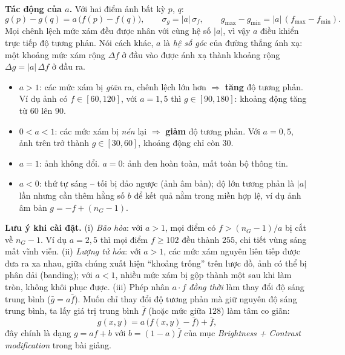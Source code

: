 \textbf{Tác động của $a$.} Với hai điểm ảnh bất kỳ $p$, $q$:
\begin{equation}
g(p) - g(q) = a\,\big(f(p) - f(q)\big), \qquad \sigma_g = |a|\,\sigma_f, \qquad g_{\max} - g_{\min} = |a|\,(f_{\max} - f_{\min}).
\label{eq:w5_contrast_scale}
\end{equation}
Mọi chênh lệch mức xám đều được nhân với cùng hệ số $|a|$, vì vậy $a$ điều khiển trực tiếp độ tương phản. Nói cách khác, $a$ là \emph{hệ số góc} của đường thẳng ánh xạ: một khoảng mức xám rộng $\Delta f$ ở đầu vào được ánh xạ thành khoảng rộng $\Delta g = |a|\,\Delta f$ ở đầu ra.
\begin{itemize}
    \item $a > 1$: các mức xám bị \emph{giãn} ra, chênh lệch lớn hơn $\Rightarrow$ \textbf{tăng} độ tương phản. Ví dụ ảnh có $f \in [60, 120]$, với $a = 1{,}5$ thì $g \in [90, 180]$: khoảng động tăng từ $60$ lên $90$.
    \item $0 < a < 1$: các mức xám bị \emph{nén} lại $\Rightarrow$ \textbf{giảm} độ tương phản. Với $a = 0{,}5$, ảnh trên trở thành $g \in [30, 60]$, khoảng động chỉ còn $30$.
    \item $a = 1$: ảnh không đổi. $a = 0$: ảnh đen hoàn toàn, mất toàn bộ thông tin.
    \item $a < 0$: thứ tự sáng -- tối bị đảo ngược (ảnh âm bản); độ lớn tương phản là $|a|$ lần nhưng cần thêm hằng số $b$ để kết quả nằm trong miền hợp lệ, ví dụ ảnh âm bản $g = -f + (n_G - 1)$.
\end{itemize}

\textbf{Lưu ý khi cài đặt.} (i) \emph{Bão hòa}: với $a > 1$, mọi điểm có $f > (n_G - 1)/a$ bị cắt về $n_G - 1$. Ví dụ $a = 2{,}5$ thì mọi điểm $f \ge 102$ đều thành $255$, chi tiết vùng sáng mất vĩnh viễn. (ii) \emph{Lượng tử hóa}: với $a > 1$, các mức xám nguyên liên tiếp được đưa ra xa nhau, giữa chúng xuất hiện ``khoảng trống'' trên lược đồ, ảnh có thể bị phân dải (banding); với $a < 1$, nhiều mức xám bị gộp thành một sau khi làm tròn, không khôi phục được. (iii) Phép nhân $a \cdot f$ \emph{đồng thời} làm thay đổi độ sáng trung bình ($\bar g = a \bar f$). Muốn chỉ thay đổi độ tương phản mà giữ nguyên độ sáng trung bình, ta lấy giá trị trung bình $\bar f$ (hoặc mức giữa $128$) làm tâm co giãn:
\begin{equation}
g(x, y) = a\,\big(f(x, y) - \bar f\big) + \bar f,
\end{equation}
đây chính là dạng $g = a f + b$ với $b = (1 - a)\bar f$ của mục \emph{Brightness + Contrast modification} trong bài giảng.

